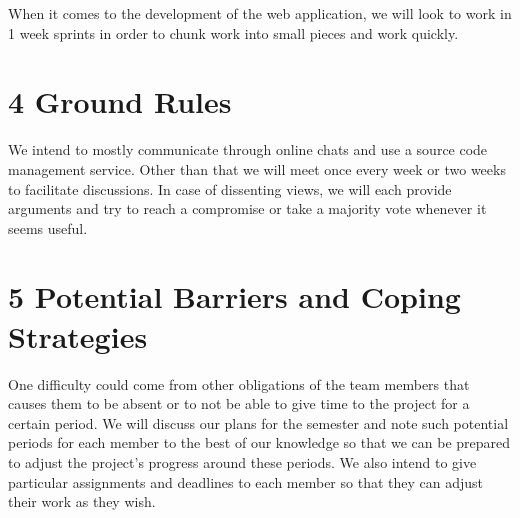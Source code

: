 \documentclass{neu_handout}
\begin{document}
When it comes to the development of the web application, we will look to work in 1 week sprints in order to chunk work into small pieces and work quickly.

\section*{4 Ground Rules}
We intend to mostly communicate through online chats and use a source code management service. Other than that we will meet once every week or two weeks to facilitate discussions. In case of dissenting views, we
will each provide arguments and try to reach a compromise or take a majority vote whenever it seems useful.

\section*{5 Potential Barriers and Coping Strategies}
One difficulty could come from other obligations of the team members that causes them to be absent or to not
be able to give time to the project for a certain period. We will discuss our plans for the semester and note such
potential periods for each member to the best of our knowledge so that we can be prepared to adjust the project’s progress around these periods. We also intend to give particular assignments and deadlines to each member so that they can adjust their work as they wish.
\end{document}
